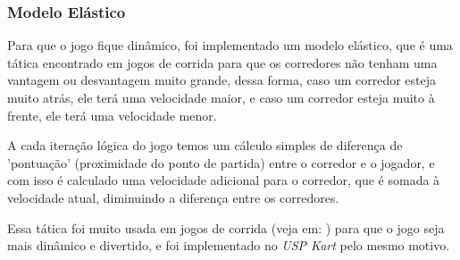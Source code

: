 \subsubsection{Modelo Elástico}

Para que o jogo fique dinâmico, foi implementado um modelo elástico, que é uma tática encontrado em jogos de corrida para que os corredores não tenham uma vantagem ou desvantagem muito grande, dessa forma, caso um corredor esteja muito atrás, ele terá uma velocidade maior, e caso um corredor esteja muito à frente, ele terá uma velocidade menor.

A cada iteração lógica do jogo temos um cálculo simples de diferença de 'pontuação' (proximidade do ponto de partida) entre o corredor e o jogador, e com isso é calculado uma velocidade adicional para o corredor, que é somada à velocidade atual, diminuindo a diferença entre os corredores.

Essa tática foi muito usada em jogos de corrida (veja em: \cite{rubberBandAi}) para que o jogo seja mais dinâmico e divertido, e foi implementado no \textit{USP Kart} pelo mesmo motivo.